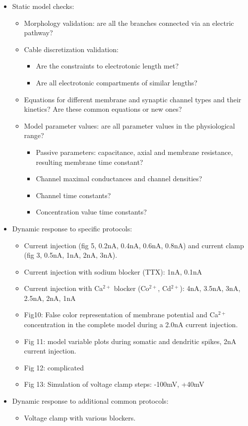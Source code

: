 \documentclass[12pt]{article}
\begin{document}
\begin{itemize}
\item Static model checks:
  \begin{itemize}
  \item Morphology validation: are all the branches connected via an
    electric pathway?
  \item Cable discretization validation:
    \begin{itemize}
    \item Are the constraints to electrotonic length met?
    \item Are all electrotonic compartments of similar lengths?
    \end{itemize}
  \item Equations for different membrane and synaptic channel types
    and their kinetics?  Are these common equations or new ones?
  \item Model parameter values: are all parameter values in the
    physiological range?
    \begin{itemize}
    \item Passive parameters: capacitance, axial and membrane
      resistance, resulting membrane time constant?
    \item Channel maximal conductances and channel densities?
    \item Channel time constants?
    \item Concentration value time constants?
    \end{itemize}
  \end{itemize}
\item Dynamic response to specific protocols:
  \begin{itemize}
  \item Current injection (fig 5, 0.2nA, 0.4nA, 0.6nA, 0.8nA) and
    current clamp (fig 3, 0.5nA, 1nA, 2nA, 3nA).
  \item Current injection with sodium blocker (TTX): 1nA, 0.1nA
  \item Current injection with Ca$^{2+}$ blocker (Co$^{2+}$,
    Cd$^{2+}$): 4nA, 3.5nA, 3nA, 2.5nA, 2nA, 1nA
  \item Fig10: False color representation of membrane potential and Ca$^{2+}$
    concentration in the complete model during a 2.0nA current
    injection.
  \item Fig 11: model variable plots during somatic and dendritic
    spikes, 2nA current injection.
  \item Fig 12: complicated
  \item Fig 13: Simulation of voltage clamp steps: -100mV, +40mV
  \end{itemize}
\item Dynamic response to additional common protocols:
  \begin{itemize}
  \item Voltage clamp with various blockers.
  \end{itemize}

\end{itemize}
\end{document}
